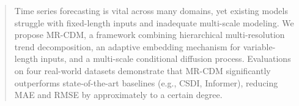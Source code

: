 \begin{abstract}
Time series forecasting is vital across many domains, yet existing models struggle with fixed-length inputs and inadequate multi-scale modeling. We propose MR-CDM, a framework combining hierarchical multi-resolution trend decomposition, an adaptive embedding mechanism for variable-length inputs, and a multi-scale conditional diffusion process. Evaluations on four real-world datasets demonstrate that MR-CDM significantly outperforms state-of-the-art baselines (e.g., CSDI, Informer), reducing MAE and RMSE by approximately to a certain degree. 
\end{abstract}